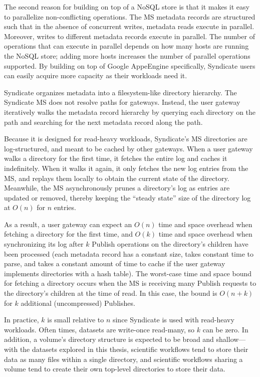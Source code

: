 The second reason for building on top of a NoSQL store is that it makes it easy
to parallelize non-conflicting operations.  The MS metadata records are
structured such that in the absence of concurrent writes,
metadata reads execute in parallel.  Moreover, writes to different metadata
records execute in parallel.  The number of operations that can execute in
parallel depends on how many hosts are running the NoSQL store; adding more
hosts increases the number of parallel operations supported.  By building on top
of Google AppeEngine specifically, Syndicate users can easily acquire more capacity as
their workloads need it.

Syndicate organizes metadata into a filesystem-like directory hierarchy.
The Syndicate MS does not resolve paths for gateways.  Instead, the user
gateway iteratively walks the metadata record hierarchy by querying each
directory on the path and searching for the next metadata record along the path.

Because it is designed for read-heavy workloads, Syndicate's MS
directories are log-structured, and meant to be cached by 
other gateways.  When a user gateway walks a directory for the first time, it
fetches the entire log and caches it indefinitely.  When it walks it again, it
only fetches the new log entries from the MS, and replays them locally to obtain
the current state of the directory.  Meanwhile, the MS asynchronously
prunes a directory's log as entries are updated or removed, thereby keeping the
``steady state'' size of the directory log at $O(n)$ for $n$ entries.

As a result, a user gateway can expect an $O(n)$ time and space overhead when
fetching a directory for the first time, and $O(k)$ time and space overhead
when synchronizing its log after $k$ Publish operations on the directory's
children have been processed (each metadata record
has a constant size, takes constant time to parse, and takes a constant amount 
of time to cache if the user gateway implements directories with a hash table).
The worst-case time and space bound for fetching a directory occurs
when the MS is receiving many Publish requests to the directory's children
at the time of read.  In this case, the bound is $O(n+k)$ for $k$ additional
(uncompressed) Publishes.

In practice, $k$ is small relative to $n$ since Syndicate is used with
read-heavy workloads.  Often times, datasets are write-once read-many,
so $k$ can be zero.  In addition, a volume's directory structure is expected
to be broad and shallow---with the datasets explored in this thesis,
scientific workflows tend to store their data as many files
within a single directory, and scientific workflows sharing a volume tend to
create their own top-level directories to store their data.

